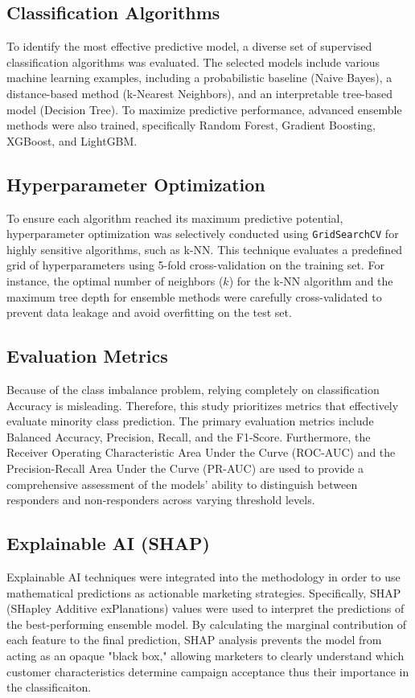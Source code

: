 \documentclass[conference]{IEEEtran}
\begin{document}
\subsection{Classification Algorithms}
To identify the most effective predictive model, a diverse set of supervised classification algorithms was evaluated. 
The selected models include various machine learning examples, including a probabilistic baseline (Naive Bayes), a distance-based method (k-Nearest Neighbors), and an interpretable tree-based model (Decision Tree). 
To maximize predictive performance, advanced ensemble methods were also trained, specifically Random Forest, Gradient Boosting, XGBoost, and LightGBM.


\subsection{Hyperparameter Optimization}
To ensure each algorithm reached its maximum predictive potential, hyperparameter optimization was selectively conducted using \texttt{GridSearchCV} for highly sensitive algorithms, such as k-NN. 
This technique evaluates a predefined grid of hyperparameters using 5-fold cross-validation on the training set. 
For instance, the optimal number of neighbors ($k$) for the k-NN algorithm and the maximum tree depth for ensemble methods were carefully cross-validated to prevent data leakage and avoid overfitting on the test set.


\subsection{Evaluation Metrics}
Because of the class imbalance problem, relying completely on classification Accuracy is misleading. 
Therefore, this study prioritizes metrics that effectively evaluate minority class prediction. 
The primary evaluation metrics include Balanced Accuracy, Precision, Recall, and the F1-Score. 
Furthermore, the Receiver Operating Characteristic Area Under the Curve (ROC-AUC) and the Precision-Recall Area Under the Curve (PR-AUC) are used to provide a comprehensive assessment of the models' ability to distinguish between responders and non-responders across varying threshold levels.


\subsection{Explainable AI (SHAP)}
Explainable AI techniques were integrated into the methodology in order to use mathematical predictions as actionable marketing strategies. 
Specifically, SHAP (SHapley Additive exPlanations) values were used to interpret the predictions of the best-performing ensemble model. 
By calculating the marginal contribution of each feature to the final prediction, SHAP analysis prevents the model from acting as an opaque "black box," allowing marketers to clearly understand which customer characteristics determine campaign acceptance thus their importance in the classificaiton.
\end{document}
